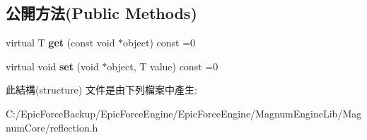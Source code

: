 \subsection*{公開方法(Public Methods)}
\begin{DoxyCompactItemize}
\item 
virtual T {\bfseries get} (const void $\ast$object) const  =0\hypertarget{structagm_1_1reflection_1_1____property__handler_____afdd1f1c5c3ed851a885caaa1978a120d}{}\label{structagm_1_1reflection_1_1____property__handler_____afdd1f1c5c3ed851a885caaa1978a120d}

\item 
virtual void {\bfseries set} (void $\ast$object, T value) const  =0\hypertarget{structagm_1_1reflection_1_1____property__handler_____a0712da7ceda5915c74d0e142f8964c02}{}\label{structagm_1_1reflection_1_1____property__handler_____a0712da7ceda5915c74d0e142f8964c02}

\end{DoxyCompactItemize}


此結構(structure) 文件是由下列檔案中產生\+:\begin{DoxyCompactItemize}
\item 
C\+:/\+Epic\+Force\+Backup/\+Epic\+Force\+Engine/\+Epic\+Force\+Engine/\+Magnum\+Engine\+Lib/\+Magnum\+Core/reflection.\+h\end{DoxyCompactItemize}
